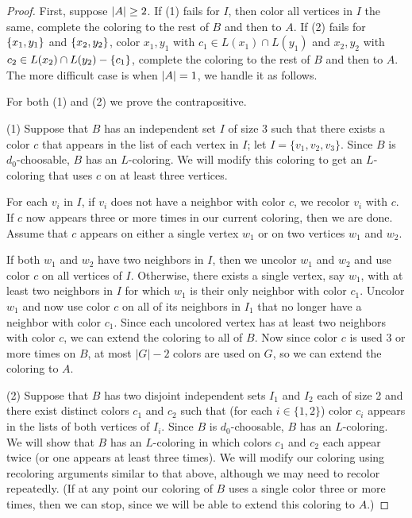 \begin{proof}
First, suppose $\left|A\right| \geq 2$. If (1) fails for $I$, then color all vertices
in $I$ the same, complete the coloring to the rest of $B$ and then to $A$.  If
(2) fails for $\left\{ x_1, y_1 \right\}$ and $\left\{ x_2, y_2 \right\}$, color $x_1, y_1$ with
$c_1 \in L(x_1) \cap L(y_1)$ and $x_2, y_2$ with $c_2 \in L(x_2) \cap L(y_2) -
\left\{ c_1 \right\}$, complete the coloring to the rest of $B$ and then to $A$.  The
more difficult case is when $\left|A\right| = 1$, we handle it as follows.

For both (1) and (2) we prove the contrapositive.

(1) Suppose that $B$ has an independent set $I$ of size 3 such that
there exists a color $c$ that appears in the list of each vertex in $I$; let
$I=\{v_1,v_2,v_3\}$.  Since $B$ is $d_0$-choosable,
$B$ has an $L$-coloring.  We will modify this coloring to get an
$L$-coloring that uses $c$ on at least three vertices.  

For each $v_i$ in $I$,
if $v_i$ does not have a neighbor with color $c$, we recolor $v_i$ with $c$. 
If $c$ now appears three or more times in our current coloring, then we are
done.  Assume that $c$ appears on either a single vertex $w_1$ or on two
vertices $w_1$ and $w_2$.  

If both $w_1$ and $w_2$ have two neighbors in $I$, then we uncolor $w_1$ and
$w_2$ and use color $c$ on all vertices of $I$.
Otherwise, there exists a single vertex, say $w_1$, with at least two neighbors
in $I$ for which $w_1$ is their only neighbor with color $c_1$.  Uncolor $w_1$
and now use color $c$ on all of its neighbors in $I_1$ that no longer have a
neighbor with color $c_1$.
Since each uncolored vertex has at least two neighbors with color $c$, we
can extend the coloring to all of $B$.  Now since color $c$ is used 3 or more
times on $B$, at most $|G|-2$ colors are used on $G$, so we can extend the
coloring to $A$.

(2) Suppose that $B$ has two disjoint independent sets $I_1$ and $I_2$ each of
size 2 and there exist distinct colors $c_1$ and $c_2$ such that (for each
$i\in\{1,2\}$) color $c_i$ appears in the lists of both vertices of $I_i$. 
Since $B$ is $d_0$-choosable, $B$ has an $L$-coloring.  We will show that $B$
has an $L$-coloring in which colors $c_1$ and $c_2$ each appear twice (or one
appears at least three times).  We will
modify our coloring using recoloring arguments similar to that above,
although we may need to recolor repeatedly.  (If at any point our coloring of
$B$ uses a single color three or more times, then we can stop, since we will be
able to extend this coloring to $A$.)


\end{proof}
